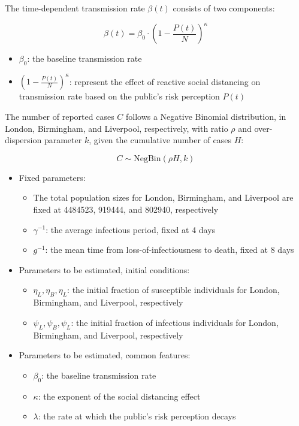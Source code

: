 \documentclass[
  letterpaper,
  DIV=11,
  numbers=noendperiod]{scrartcl}
\providecommand{\tightlist}{%
  \setlength{\itemsep}{0pt}\setlength{\parskip}{0pt}}\usepackage{longtable,booktabs,array}
\begin{document}
\framebreak

The time-dependent transmission rate \(\beta(t)\) consists of two
components:

\begin{equation}
\beta(t) =\beta_{0}\cdot \left(1-\frac{P(t)}{N}\right)^{\kappa}
\end{equation}

\begin{itemize}
\tightlist
\item
  \(\beta_{0}\): the baseline transmission rate
\item
  \(\left(1-\frac{P(t)}{N}\right)^{\kappa}\): represent the effect of
  reactive social distancing on transmission rate based on the public's
  risk perception \(P(t)\)
\end{itemize}

\vfill

The number of reported cases \(C\) follows a Negative Binomial
distribution, in London, Birmingham, and Liverpool, respectively, with
ratio \(\rho\) and over-dispersion parameter \(k\), given the cumulative
number of cases \(H\):

\[
  C \sim \mathrm{NegBin}(\rho H,k)
\]

\framebreak

\begin{itemize}
\tightlist
\item
  Fixed parameters:

  \begin{itemize}
  \tightlist
  \item
    The total population sizes for London, Birmingham, and Liverpool are
    fixed at 4484523, 919444, and 802940, respectively
  \item
    \(\gamma^{-1}\): the average infectious period, fixed at 4 days
  \item
    \(g^{-1}\): the mean time from loss-of-infectiousness to death,
    fixed at 8 days
  \end{itemize}
\item
  Parameters to be estimated, initial conditions:

  \begin{itemize}
  \tightlist
  \item
    \(\eta_L, \eta_B,\eta_L\): the initial fraction of susceptible
    individuals for London, Birmingham, and Liverpool, respectively
  \item
    \(\psi_L,\psi_B,\psi_L\): the initial fraction of infectious
    individuals for London, Birmingham, and Liverpool, respectively
  \end{itemize}
\item
  Parameters to be estimated, common features:

  \begin{itemize}
  \tightlist
  \item
    \(\beta_{0}\): the baseline transmission rate
  \item
    \(\kappa\): the exponent of the social distancing effect
  \item
    \(\lambda\): the rate at which the public's risk perception decays
  \end{itemize}
\end{itemize}
\end{document}
